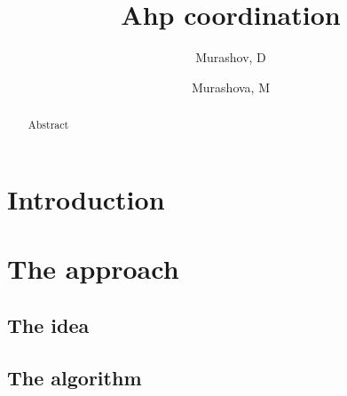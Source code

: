 \documentclass{article}
\author{Murashov, D \and Murashova, M}
\title{Ahp coordination}
\begin{document}
    \maketitle

    \begin{abstract}
        Abstract
    \end{abstract}

    \section{Introduction}

    

    \section{The approach}

    \subsection{The idea}

    

    \subsection{The algorithm}

    

    \medskip

    

    
\end{document}

